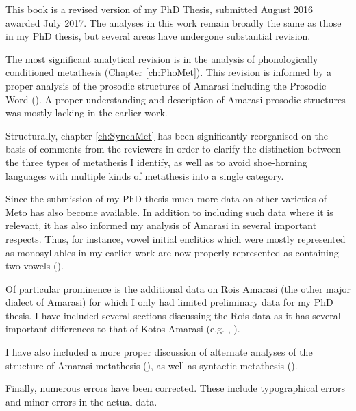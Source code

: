 \begin{refsection}

This book is a revised version of my PhD Thesis,
submitted August 2016 awarded July 2017.
The analyses in this work remain broadly the same as those in my PhD thesis,
but several areas have undergone substantial revision.

The most significant analytical revision
is in the analysis of phonologically conditioned
metathesis (Chapter \ref{ch:PhoMet}).
This revision is informed by a proper analysis of
the prosodic structures of Amarasi including
the Prosodic Word ().
A proper understanding and description
of Amarasi prosodic structures was mostly lacking in the earlier work.

Structurally, chapter \ref{ch:SynchMet}
has been significantly reorganised on the basis
of comments from the reviewers in order to clarify
the distinction between the three types of metathesis
I identify, as well as to avoid shoe-horning languages
with multiple kinds of metathesis into a single category.

Since the submission of my PhD thesis much more data
on other varieties of Meto has also become available.
In addition to including such data where it is relevant,
it has also informed my analysis of Amarasi in several important respects.
Thus, for instance, vowel initial enclitics which were mostly represented
as monosyllables in my earlier work are now properly
represented as containing two vowels ().

Of particular prominence is the additional data
on Ro{\Q}is Amarasi (the other major dialect of Amarasi)
for which I only had limited preliminary data for my PhD thesis.
I have included several sections discussing
the Ro{\Q}is data as it has several important
differences to that of Kotos Amarasi
(e.g. , ).

I have also included a more proper discussion
of alternate analyses of the structure of Amarasi
metathesis (), as well
as syntactic metathesis ().

Finally, numerous errors have been corrected.
These include typographical errors
and minor errors in the actual data.

\end{refsection}

